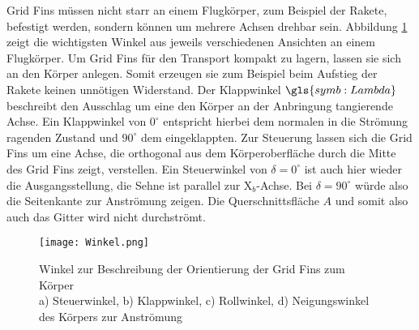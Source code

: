 Grid Fins müssen nicht starr an einem Flugkörper, zum Beispiel der Rakete, befestigt werden, sondern können um mehrere Achsen drehbar sein. Abbildung \ref{abb_winkel} zeigt die wichtigsten Winkel aus jeweils verschiedenen Ansichten an einem Flugkörper. Um Grid Fins für den Transport kompakt zu lagern, lassen sie sich an den Körper anlegen. Somit erzeugen sie zum Beispiel beim Aufstieg der Rakete keinen unnötigen Widerstand. Der Klappwinkel $\gls{symb:Lambda}$ beschreibt den Ausschlag um eine den Körper an der Anbringung tangierende Achse. Ein Klappwinkel von $0^\circ$ entspricht hierbei dem normalen in die Strömung ragenden Zustand und $90^\circ$ dem eingeklappten. Zur Steuerung lassen sich die Grid Fins um eine Achse, die orthogonal aus dem Körperoberfläche durch die Mitte des Grid Fins zeigt, verstellen. Ein Steuerwinkel von $\delta = 0^\circ$ ist auch hier wieder die Ausgangsstellung, die Sehne ist parallel zur X$_b$-Achse. Bei $\delta = 90^\circ$ würde also die Seitenkante zur Anströmung zeigen. Die Querschnittsfläche $A$ und somit also auch das Gitter wird nicht durchströmt.
\begin{figure}[h]
	\centering
	\texttt{[image: Winkel.png]}
	\caption{Winkel zur Beschreibung der Orientierung der Grid Fins zum Körper\\a) Steuerwinkel, b) Klappwinkel, c) Rollwinkel, d) Neigungswinkel des Körpers zur Anströmung}
	\label{abb_winkel}
\end{figure}\\
